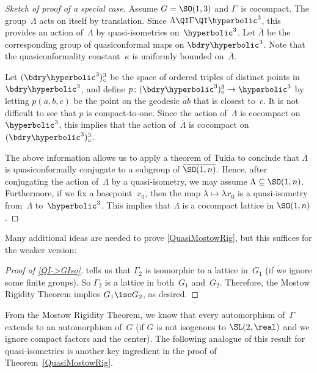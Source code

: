  \begin{proof}[Sketch of proof of a special case]
 Assume $G = \SO(1,3)$ and $\Gamma$~is cocompact. 
The group~$\Lambda$ acts on itself by translation. Since $\Lambda \QI \Gamma \QI \hyperbolic^3$, this provides an action of~$\Lambda$ by quasi-isometries on~$\hyperbolic^3$. Let $\overline{\Lambda}$ be the corresponding group of quasiconformal maps on $\bdry\hyperbolic^3$. Note that the quasiconformality constant~$\kappa$ is uniformly bounded on~$\overline{\Lambda}$.

Let $(\bdry\hyperbolic^3)^3_\circ$ be the space of ordered triples of distinct points in $\bdry\hyperbolic^3$, and define $p \colon (\bdry\hyperbolic^3)^3_\circ \to \hyperbolic^3$ by letting $p(a,b,c)$ be the point on the geodesic $\overline{ab}$ that is closest to~$c$. It is not difficult to see that $p$ is compact-to-one. Since the action of~$\Lambda$ is cocompact on $\hyperbolic^3$, this implies that the action of~$\overline{\Lambda}$ is cocompact on $(\bdry\hyperbolic^3)^3_\circ$. 

The above information allows us to apply a theorem of Tukia to conclude that $\overline{\Lambda}$ is quasiconformally conjugate to a subgroup of $\overline{\SO(1,n)}$. Hence, after conjugating the action of~$\Lambda$ by a quasi-isometry, 
we may assume $\Lambda \subseteq \SO(1,n)$. Furthermore, if we fix a basepoint~$x_0$, then the map $\lambda \mapsto \lambda x_0$ is a quasi-isometry from~$\Lambda$ to~$\hyperbolic^3$. This implies that $\Lambda$ is a cocompact lattice in $\SO(1,n)$.
 \end{proof}

Many additional ideas are needed to prove \cref{QuasiMostowRig}, but this suffices for the weaker version:

\begin{proof}[Proof of \cref{QI->GIso}]
 tells us that $\Gamma_2$ is isomorphic to a lattice in~$G_1$ (if we ignore some finite groups). So $\Gamma_2$ is a lattice in both~$G_1$ and~$G_2$. Therefore, the Mostow Rigidity Theorem  implies $G_1 \iso G_2$, as desired. 
\end{proof}

From the Mostow Rigidity Theorem, we know that every
automorphism of~$\Gamma$ extends to an automorphism of~$G$
(if $G$ is not isogenous to $\SL(2,\real)$ and we ignore compact factors and the center). The following
analogue of this result for quasi-isometries is another key ingredient in the proof of
Theorem~\ref{QuasiMostowRig}.

